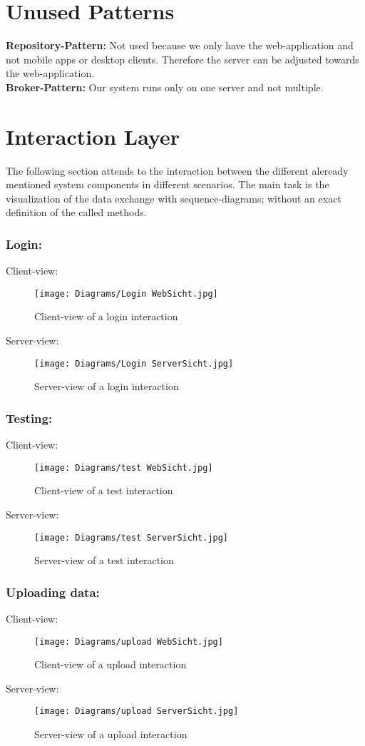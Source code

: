 \documentclass{book}
\begin{document}
\chapter{Unused Patterns}
\textbf{Repository-Pattern:} Not used because we only have the web-application and not mobile apps or desktop clients. Therefore the server can be adjusted towards the web-application.\\
\textbf{Broker-Pattern:} Our system runs only on one server and not multiple.
\chapter{Interaction Layer}
The following section attends to the interaction between the different aleready mentioned system components in different scenarios. The main task is the visualization of the data exchange with sequence-diagrams; without an exact definition of the called methods.
\subsection{Login:}
Client-view:
\begin{figure}[H]
\centering
\texttt{[image: Diagrams/Login WebSicht.jpg]}
\caption{Client-view of a login interaction}
\label{Fig. 9}
\end{figure}
Server-view:
\begin{figure}[H]
\centering
\texttt{[image: Diagrams/Login ServerSicht.jpg]}
\caption{Server-view of a login interaction}
\label{Fig. 10}
\end{figure}
\subsection{Testing:}
Client-view:
\begin{figure}[H]
\centering
\texttt{[image: Diagrams/test WebSicht.jpg]}
\caption{Client-view of a test interaction}
\label{Fig. 11}
\end{figure}
Server-view:
\begin{figure}[H]
\centering
\texttt{[image: Diagrams/test ServerSicht.jpg]}
\caption{Server-view of a test interaction}
\label{Fig. 12}
\end{figure}
\subsection{Uploading data:}
Client-view:
\begin{figure}[H]
\centering
\texttt{[image: Diagrams/upload WebSicht.jpg]}
\caption{Client-view of a upload interaction}
\label{Fig. 13}
\end{figure}
Server-view:
\begin{figure}[H]
\centering
\texttt{[image: Diagrams/upload ServerSicht.jpg]}
\caption{Server-view of a upload interaction}
\label{Fig. 14}
\end{figure}
\end{document}
